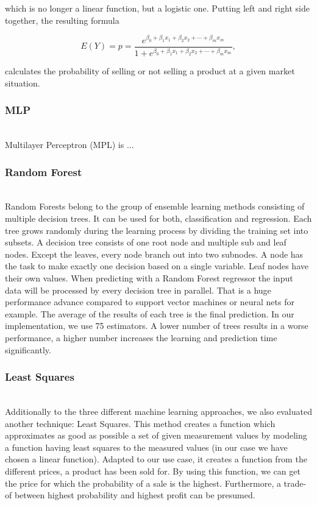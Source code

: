     which is no longer a linear function, but a logistic one. Putting left and right side together, the resulting formula

    \begin{equation}
    \label{eq.logreg.logsolved}
    E(Y) = p = \frac{e^{\beta _{0}+\beta _{1}x_{1}+\beta _{2}x_{2}+\cdots +\beta _{m}x_{m}}}{1+e^{\beta _{0}+\beta _{1}x_{1}+\beta _{2}x_{2}+\cdots +\beta _{m}x_{m}}},
    \end{equation}

    calculates the probability of selling or not selling a product at a given market situation.
    \nocite{logreg}
\subsubsection{MLP}
    ~\\
    Multilayer Perceptron (MPL) is ...
\subsubsection{Random Forest}
    ~\\
    Random Forests belong to the group of ensemble learning methods consisting of multiple decision trees. It can be used for both, classification and regression. Each tree grows randomly during the learning process by dividing the training set into subsets. A decision tree consists of one root node and multiple sub and leaf nodes. Except the leaves, every node branch out into two subnodes. A node has the task to make exactly one decision based on a single variable. Leaf nodes have their own values. When predicting with a Random Forest regressor the input data will be processed by every decision tree in parallel. That is a huge performance advance compared to support vector machines or neural nets for example. The average of the results of each tree is the final prediction.
    In our implementation, we use 75 estimators. A lower number of trees results in a worse performance, a higher number increases the learning and prediction time significantly.
    \nocite{randfor}
\subsubsection{Least Squares}
	~\\
	Additionally to the three different machine learning approaches, we also evaluated another technique: Least Squares. This method creates a function which approximates as good as possible a set of given measurement values by modeling a function having least squares to the measured values (in our case we have chosen a linear function). Adapted to our use case, it creates a function from the different prices, a product has been sold for. By using this function, we can get the price for which the probability of a sale is the highest. Furthermore, a trade-of between highest probability and highest profit can be presumed.
